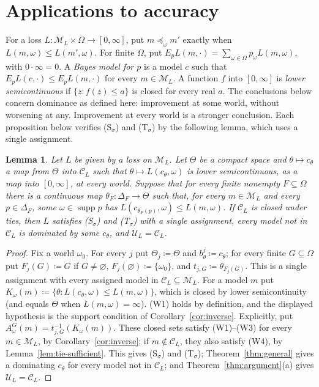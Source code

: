 \documentclass[11pt]{article}
\newtheorem{lemma}[theorem]{Lemma}
\theoremstyle{definition}
\theoremstyle{remark}
\newcommand{\M}{\mathcal M}
\newcommand{\C}{\mathcal C}
\newcommand{\U}{\mathcal U}
\newcommand{\supp}{\operatorname{supp}}
\begin{document}
\section{Applications to accuracy}\label{sec:short-applications}
For a loss $L:\M_L\times\Omega\to[0,\infty]$, put $m\preceq_\omega m'$ exactly when $L(m,\omega)\le L(m',\omega)$. For finite $\Omega$, put $E_pL(m,\cdot)=\sum_{\omega\in\Omega}p_\omega L(m,\omega)$, with $0\cdot\infty=0$. A \emph{Bayes model for $p$} is a model $c$ such that $E_pL(c,\cdot)\le E_pL(m,\cdot)$ for every $m\in\M_L$. A function $f$ into $[0,\infty]$ is \emph{lower semicontinuous} if $\{z:f(z)\le a\}$ is closed for every real $a$. The conclusions below concern dominance as defined here: improvement at some world, without worsening at any. Improvement at every world is a stronger conclusion. Each proposition below verifies (S$_\sigma$) and (T$_\sigma$) by the following lemma, which uses a single assignment.

\begin{lemma}\label{lem:loss-selection}
Let $L$ be given by a loss on $\M_L$. Let $\Theta$ be a compact space and $\theta\mapsto c_\theta$ a map from $\Theta$ into $\C_L$ such that $\theta\mapsto L(c_\theta,\omega)$ is lower semicontinuous, as a map into $[0,\infty]$, at every world. Suppose that for every finite nonempty $F\subseteq\Omega$ there is a continuous map $\theta_F:\Delta_F\to\Theta$ such that, for every $m\in\M_L$ and every $p\in\Delta_F$, some $\omega\in\supp p$ has $L(c_{\theta_F(p)},\omega)\le L(m,\omega)$. If $\C_L$ is closed under ties, then $L$ satisfies (S$_\sigma$) and (T$_\sigma$) with a single assignment, every model not in $\C_L$ is dominated by some $c_\theta$, and $\U_L=\C_L$.
\end{lemma}
\begin{proof}
Fix a world $\omega_0$. For every $j$ put $\Theta_j\coloneqq\Theta$ and $b^j_\theta\coloneqq c_\theta$; for every finite $G\subseteq\Omega$ put $F_j(G)\coloneqq G$ if $G\ne\varnothing$, $F_j(\varnothing)\coloneqq\{\omega_0\}$, and $t_{j,G}\coloneqq\theta_{F_j(G)}$. This is a single assignment with every assigned model in $\C_L\subseteq\M_L$. For a model $m$ put $K_\omega(m)\coloneqq\{\theta:L(c_\theta,\omega)\le L(m,\omega)\}$, which is closed by lower semicontinuity (and equals $\Theta$ when $L(m,\omega)=\infty$). (W1) holds by definition, and the displayed hypothesis is the support condition of Corollary~\ref{cor:inverse}. Explicitly, put $A^G_\omega(m)=t_{j,G}^{-1}(K_\omega(m))$. These closed sets satisfy (W1)--(W3) for every $m\in\M_L$, by Corollary~\ref{cor:inverse}; if $m\notin\C_L$, they also satisfy (W4), by Lemma~\ref{lem:tie-sufficient}. This gives (S$_\sigma$) and (T$_\sigma$); Theorem~\ref{thm:general} gives a dominating $c_\theta$ for every model not in $\C_L$; and Theorem~\ref{thm:argument}(a) gives $\U_L=\C_L$.
\end{proof}
\end{document}
